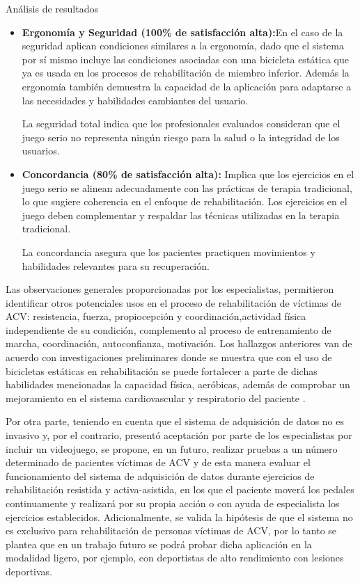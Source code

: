 \begin{thesischapter}{3} {Análisis de resultados}
\begin{itemize}
        \item \textbf{Ergonomía y Seguridad (100\% de satisfacción alta):}En el caso de la seguridad aplican condiciones similares a la ergonomía, dado
        que el sistema por sí mismo incluye las condiciones asociadas con una bicicleta estática que ya es usada en los procesos de rehabilitación de miembro inferior.
        Además la ergonomía también demuestra la capacidad de la aplicación para adaptarse a las necesidades y habilidades cambiantes del usuario. 
        
        La seguridad total indica que los profesionales evaluados consideran que el juego serio no representa ningún riesgo para la salud o la integridad de los usuarios.
        
        \item \textbf{Concordancia (80\% de satisfacción alta):} Implica que los ejercicios en el juego serio se alinean adecuadamente con las prácticas de terapia tradicional, 
        lo que sugiere coherencia en el enfoque de rehabilitación. Los ejercicios en el juego deben complementar y respaldar las técnicas utilizadas en la terapia tradicional. 
        
        La concordancia asegura que los pacientes practiquen movimientos y habilidades relevantes para su recuperación.
    \end{itemize}
    \vspace{10pt}
    Las observaciones generales proporcionadas por los especialistas, permitieron identificar otros potenciales usos en el
    proceso de rehabilitación de víctimas de ACV: resistencia, fuerza, propiocepción y coordinación,actividad física independiente 
    de su condición, complemento al proceso de entrenamiento de marcha, coordinación, autoconfianza, motivación. Los hallazgos anteriores 
    van de acuerdo con investigaciones preliminares donde se muestra que con el uso de bicicletas estáticas en rehabilitación se puede fortalecer 
    a parte de dichas habilidades mencionadas la capacidad física, aeróbicas, además de comprobar un mejoramiento en el sistema cardiovascular y 
    respiratorio del paciente \cite{phadke2019impact, nardone2017passive}.


    \vspace{10pt}
    Por otra parte, teniendo en cuenta que el sistema de adquisición de datos no es invasivo
    y, por el contrario, presentó aceptación por parte de los especialistas por incluir
    un videojuego, se propone, en un futuro, realizar pruebas a un número determinado de pacientes víctimas de ACV 
    y de esta manera evaluar el funcionamiento del sistema de adquisición de datos durante
    ejercicios de rehabilitación resistida y activa-asistida, en los que el paciente moverá los pedales 
    continuamente y realizará por su propia acción o con ayuda de especialista los ejercicios establecidos. 
    Adicionalmente, se valida la hipótesis de que el sistema no es exclusivo
    para rehabilitación de personas víctimas de ACV, por lo tanto se plantea que en
    un trabajo futuro se podrá probar dicha aplicación en la modalidad ligero, por ejemplo, con deportistas de alto rendimiento con lesiones deportivas.



\end{thesischapter}
